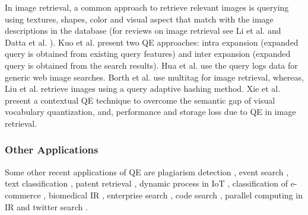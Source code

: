 In image retrieval, a common approach to retrieve relevant images is querying using textures, shapes, color and visual aspect that match with the image descriptions in the database (for reviews on image retrieval see Li et al. \cite{li2016socializing} and Datta et al. \cite{datta2008image}). Kuo et al. \cite{kuo2009query} present two QE approaches: intra expansion (expanded query is obtained from existing query features) and inter expansion (expanded query is obtained from the search results). Hua et al. \cite{hua2013clickage} use the query logs data for generic web image searches. Borth et al. \cite{borth2013large} use multitag for image retrieval, whereas, Liu et al. \cite{liu2013image} retrieve images using a query adaptive hashing method. Xie et al. \cite{xie2014contextual} present a contextual QE technique to overcome the semantic gap of visual vocabulary quantization, and,  performance and storage loss due to QE in image retrieval. 
\subsubsection{Other Applications}
Some other recent applications of QE are  plagiarism detection \cite{nawab2016ir}, event search \cite{douze2013stable,atefeh2015survey,boer2015knowledge}, text classification \cite{wang2016semantic}, patent retrieval \cite{magdy2011study,mahdabi2014effect,wang2016domain}, dynamic process in IoT \cite{huber2016goal,huber2016using}, classification of e-commerce \cite{jammalamadaka2015query}, biomedical IR \cite{abdulla2016improving}, enterprise search \cite{liu2014exploiting}, code search \cite{nie2016query}, parallel computing in IR \cite{doi:10.1108/EUM0000000007201} and twitter search \cite{kumar2013time,zingla2016short}.

